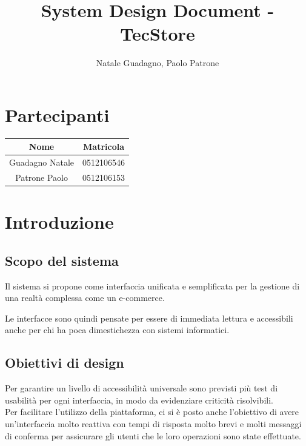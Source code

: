 \documentclass[12pt,a4paper]{article}
\author{Natale Guadagno, Paolo Patrone}
\title{System Design Document - TecStore}
\begin{document}
\maketitle
\newpage
\tableofcontents
\newpage
{}
\section*{Partecipanti}
\begin{center}
\begin{tabular} {|c|c|}
\hline
\textbf{Nome} & \textbf{Matricola} \\
\hline
Guadagno Natale & 0512106546 \\
Patrone Paolo & 0512106153 \\
\hline
\end{tabular}
\end{center}
\newpage

\section{Introduzione}
\subsection{Scopo del sistema}
Il sistema si propone come interfaccia unificata e semplificata per la gestione di una realtà complessa come un e-commerce.

Le interfacce sono quindi pensate per essere di immediata lettura e accessibili anche per chi ha poca dimestichezza con sistemi informatici.

\subsection{Obiettivi di design}
Per garantire un livello di accessibilità universale sono previsti più test di usabilità per ogni interfaccia, in modo da evidenziare criticità risolvibili. \\
Per facilitare l'utilizzo della piattaforma, ci si è posto anche l'obiettivo di avere un'interfaccia molto reattiva con tempi di risposta molto brevi e molti messaggi di conferma per assicurare gli utenti che le loro operazioni sono state effettuate.
\end{document}
